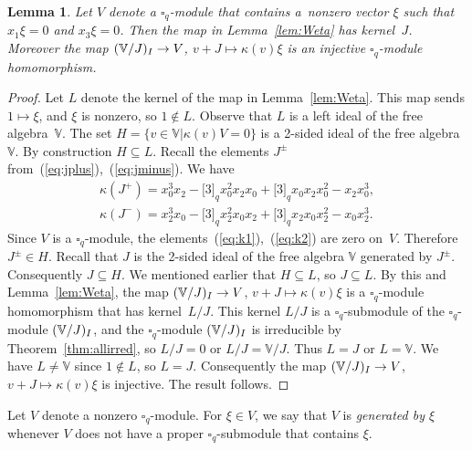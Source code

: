 \documentclass[11pt]{article}
\numberwithin{equation}{section}
\numberwithin{equation}{section}
\newtheorem{Lemma}[Theorem]{Lemma}
\begin{document}
{\begin{Lemma}\label{lem:qSerreW} Let $V$ denote a $\square_q$-module that contains a~nonzero vector $\xi$ such that $x_1 \xi = 0 $ and $x_3 \xi = 0$. Then the map in Lemma~{\rm \ref{lem:Weta}} has kernel~$J$.
Moreover the map $(\mathbb V/J)_{\rm I} \to V$, $v+J \mapsto \kappa(v)\xi$ is an injective $\square_q$-module homomorphism.
\end{Lemma}
\begin{proof}Let $L$ denote the kernel of the map in Lemma~\ref{lem:Weta}. This map sends $1 \mapsto \xi$, and $\xi$ is nonzero, so $1 \not \in L$. Observe that $L$ is a left ideal of the free algebra~$\mathbb V$.
The set $H= \lbrace v \in \mathbb V| \kappa(v)V=0\rbrace$ is a 2-sided ideal of the free algebra~$\mathbb V$. By construction $H \subseteq L$. Recall the elements $J^{\pm}$ from~(\ref{eq:jplus}),~(\ref{eq:jminus}). We have
\begin{gather}
\kappa(J^+) =x^3_0 x_{2} - \lbrack 3 \rbrack_q x^2_0 x_{2} x_0 +\lbrack 3 \rbrack_q x_0 x_{2} x^2_0 -x_{2} x^3_0,\label{eq:k1}\\
\kappa(J^-)=x^3_2 x_{0} - \lbrack 3 \rbrack_q x^2_2 x_{0} x_2 +\lbrack 3 \rbrack_q x_2 x_{0} x^2_2 -x_{0} x^3_2.\label{eq:k2}
\end{gather}
Since $V$ is a $\square_q$-module, the elements~(\ref{eq:k1}),~(\ref{eq:k2}) are zero on~$V$. Therefore
$J^\pm \in H$. Recall that $J$ is the 2-sided ideal of the free algebra $\mathbb V$ generated by $J^{\pm}$. Consequently $J \subseteq H$. We mentioned earlier that $H \subseteq L$, so $J \subseteq L$.
By this and Lemma~\ref{lem:Weta}, the map $(\mathbb V/J)_{\rm I} \to V$, $v+J \mapsto \kappa(v)\xi$
is a $\square_q$-module homomorphism that has kernel~$L/J$. This kernel $L/J$ is a $\square_q$-submodule of the $\square_q$-module $(\mathbb V/J)_{\rm I}$, and the $\square_q$-module $(\mathbb V/J)_{\rm I}$ is irreducible by Theorem~\ref{thm:allirred}, so $L/J=0$ or $L/J=\mathbb V/J$. Thus $L=J$ or $L=\mathbb V$.
We have $L\not=\mathbb V$ since $1 \not\in L$, so $L=J$. Consequently the map $(\mathbb V/J)_{\rm I} \to V$, $v+J \mapsto \kappa(v)\xi$ is injective. The result follows.
\end{proof}

Let $V$ denote a nonzero $\square_q$-module. For $\xi\in V$, we say that $V$ is {\it generated by $\xi$} whenever $V$ does not have a proper $\square_q$-submodule that contains $\xi$.

}
\end{document}

